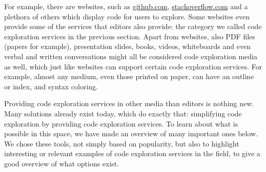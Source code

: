 For example, there are websites, such as \href{https://github.com}{github.com}, \href{https://stackoverflow.com}{stackoverflow.com} and a plethora of others which display code for users to explore.
Some websites even provide some of the services that editors also provide: the category we called code exploration services in the previous section.
Apart from websites, also PDF files (papers for example), presentation slides, books, videos, whiteboards and even verbal and written conversations might all be considered code exploration media as well,
which just like websites can support certain code exploration services.
For example, almost any medium, even those printed on paper, can have an outline or index, and syntax coloring.

Providing code exploration services in other media than editors is nothing new.
Many solutions already exist today, which do exactly that: simplifying code exploration by providing code exploration services.
To learn about what is possible in this space, we have made an overview of many important ones below.
We chose these tools, not simply based on popularity, but also to highlight interesting or relevant examples of code exploration services in
the field, to give a good overview of what options exist.





